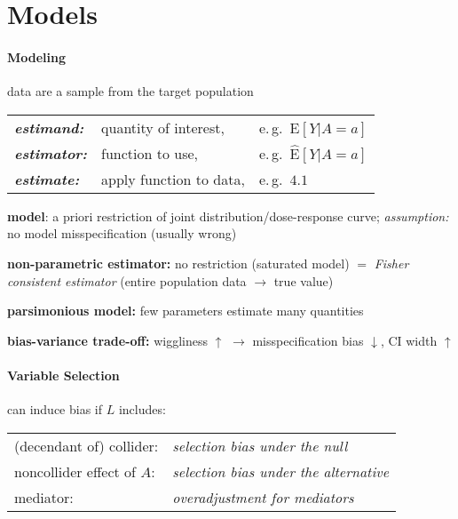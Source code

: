 \documentclass[8pt,oneside]{extarticle}
\begin{document}



\section{Models}

\begin{multicols}{2}

\paragraph{\large Modeling} data are a sample from the target population \vspace{0.4em}

\noindent \hspace{0.9em}\begin{tabular}{l l l}
\textbf{\it estimand:} & quantity  of interest, & e.\,g.\ $\mathrm{E}\left[Y|A=a\right]$ \\
\textbf{\it estimator:} & function to use, & e.\,g.\ $\widehat{\mathrm{E}}\left[Y|A=a\right]$ \\
\textbf{\it estimate:} & apply function to data, & e.\,g.\ $4.1$ 
\end{tabular} \vspace{0.5em}

\noindent \textbf{model}: a priori restriction of joint distribution/dose-response curve;  \textit{assumption:} no model misspecification (usually wrong)

\noindent \textbf{non-parametric estimator:} no restriction (saturated model) $=$ \textit{Fisher consistent estimator} (entire population data $\rightarrow$ true value)

\noindent \textbf{parsimonious model:} few parameters estimate many quantities

\noindent \textbf{bias-variance trade-off:} \newline wiggliness $\uparrow$ $\rightarrow$ misspecification bias $\downarrow$, CI width $\uparrow$

\paragraph{\large Variable Selection} can induce bias if $L$ includes: 

\hspace{-0.2em}\vspace{-1em}
\begin{tabular}{l l }
 (decendant of) collider:& \textit{selection bias under the null}\\
 noncollider effect of $A$:& \textit{selection bias under the alternative}\\
 mediator:& \textit{overadjustment for mediators}
\end{tabular}


\end{multicols}
\end{document}
